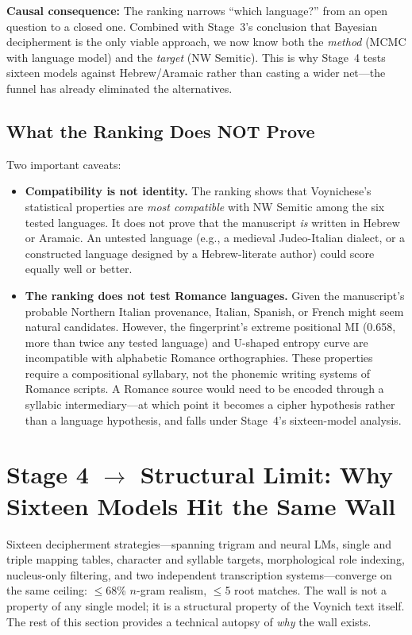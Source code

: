 \documentclass[11pt,a4paper]{article}
\begin{document}
\noindent\textbf{Causal consequence:} The ranking narrows ``which language?'' from an open question to a closed one.  Combined with Stage~3's conclusion that Bayesian decipherment is the only viable approach, we now know both the \emph{method} (MCMC with language model) and the \emph{target} (NW Semitic).  This is why Stage~4 tests sixteen models against Hebrew/Aramaic rather than casting a wider net---the funnel has already eliminated the alternatives.

\subsection{What the Ranking Does NOT Prove}

Two important caveats:

\begin{itemize}[nosep]
  \item \textbf{Compatibility is not identity.}  The ranking shows that Voynichese's statistical properties are \emph{most compatible} with NW Semitic among the six tested languages.  It does not prove that the manuscript \emph{is} written in Hebrew or Aramaic.  An untested language (e.g., a medieval Judeo-Italian dialect, or a constructed language designed by a Hebrew-literate author) could score equally well or better.
  \item \textbf{The ranking does not test Romance languages.}  Given the manuscript's probable Northern Italian provenance, Italian, Spanish, or French might seem natural candidates.  However, the fingerprint's extreme positional MI (0.658, more than twice any tested language) and U-shaped entropy curve are incompatible with alphabetic Romance orthographies.  These properties require a compositional syllabary, not the phonemic writing systems of Romance scripts.  A Romance source would need to be encoded through a syllabic intermediary---at which point it becomes a cipher hypothesis rather than a language hypothesis, and falls under Stage~4's sixteen-model analysis.
\end{itemize}


\section{Stage 4 $\to$ Structural Limit: Why Sixteen Models Hit the Same Wall}

Sixteen decipherment strategies---spanning trigram and neural LMs, single and triple mapping tables, character and syllable targets, morphological role indexing, nucleus-only filtering, and two independent transcription systems---converge on the same ceiling: $\leq$68\% $n$-gram realism, $\leq$5 root matches.  The wall is not a property of any single model; it is a structural property of the Voynich text itself.  The rest of this section provides a technical autopsy of \emph{why} the wall exists.
\end{document}
